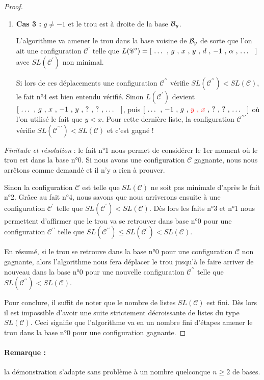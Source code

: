 \begin{proof}
\begin{enumerate}
		\item \textbf{Cas 3 :} $g \neq -1$ et le trou est à droite de la base ${\cal B}_y$. 
		
		L'algorithme va amener le trou dans la base voisine de ${\cal B}_y$ de sorte que l'on ait une configuration $\mathscr{C}^\prime$ telle que $L(\mathscr{C}^\prime) = [ \text{\ \dots{} , $g$ , $x$ , $y$ , $d$ , $-1$ , $\alpha$ , \dots{} \ } ]$ avec $SL(\mathscr{C}^\prime)$ non minimal.
		
		Si lors de ces déplacements une configuration $\mathscr{C}^{\prime\prime}$ vérifie $SL(\mathscr{C}^{\prime\prime}) < SL(\mathscr{C})$, le fait n°4 est bien entendu vérifié.
		Sinon $L(\mathscr{C}^\prime)$ devient $[ \text{\ \dots{} , $g$ , $x$ , $-1$ , $y$ , $?$ , $?$ , \dots{} \ } ]$, puis $[ \text{\ \dots{} , $-1$ , $g$ , {\color{red} $y$ , $x$} , $?$ , $?$ , \dots{} \ } ]$ où l'on utilisé le fait que $y < x$. Pour cette dernière liste, la configuration $\mathscr{C}^{\prime\prime\prime}$ vérifie $SL(\mathscr{C}^{\prime\prime\prime}) < SL(\mathscr{C})$ et c'est gagné !
	\end{enumerate}
	

	\medskip

	\textit{Finitude et résolution} : le fait n°1 nous permet de considérer le 1er moment où le trou est dans la base n°0.
	Si nous avons une configuration $\mathscr{C}$ gagnante, nous nous arrêtons comme demandé et il n'y a rien à prouver.


	\medskip
	
	Sinon la configuration $\mathscr{C}$  est telle que $SL(\mathscr{C})$ ne soit pas minimale d'après le fait n°2.
	Grâce au fait n°4, nous savons que nous arriverons ensuite à une configuration $\mathscr{C}^\prime$ telle que $SL(\mathscr{C}^\prime) < SL(\mathscr{C})$.
	Dès lors les faits n°3 et n°1 nous permettent d'affirmer que le trou va se retrouver dans base n°0 pour une configuration $\mathscr{C}^{\prime\prime}$ telle que $SL(\mathscr{C}^{\prime\prime}) \leqslant SL(\mathscr{C}^\prime) < SL(\mathscr{C})$. 


	\medskip
	
	En résumé, si le trou se retrouve dans la base n°0 pour une configuration $\mathscr{C}$ non gagnante, alors l'algorithme nous fera déplacer le trou jusqu'à le faire arriver de nouveau dans la base n°0 pour une nouvelle configuration $\mathscr{C}^{\prime\prime}$ telle que $SL(\mathscr{C}^{\prime\prime}) < SL(\mathscr{C})$.
	
	
	\medskip
	
	Pour conclure, il suffit de noter que le nombre de listes $SL(\mathscr{C})$ est fini.
	Dès lors il est impossible d'avoir une suite strictement décroissante de listes du type $SL(\mathscr{C})$.
	Ceci signifie que l'algorithme va en un nombre fini d'étapes amener le trou dans la base n°0 pour une configuration gagnante.  
\end{proof}


\paragraph{Remarque :} \hspace{-1em} la démonstration s'adapte sans problème à un nombre quelconque $n \geqslant 2$ de bases.